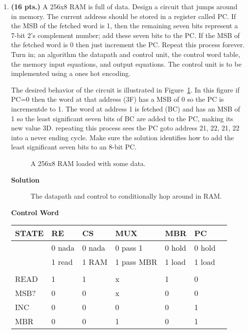 \begin{enumerate}
\item \textbf{ (16 pts.)}
A 256x8 RAM is full of data.  Design a circuit that jumps 
around in memory.   The current address should be stored in a
register called PC.  If the MSB of the fetched word is 1, then the 
remaining seven bits represent a 7-bit 2's complement number;  add these 
seven bits to the PC.  If the MSB of the fetched word is 0 then just 
increment the PC.  Repeat this process forever.
Turn in; an algorithm
the datapath and control unit,
the control word table,
the memory input equations, and
output equations.  
The control unit is to be implemented using a ones hot encoding.

The desired behavior of the circuit is illustrated in 
Figure~\ref{fig:RAMhopper2}.  In this figure if PC=0 then the word at
that address (3F) has a MSB of 0 so the PC is incrementde to 1. The
word at address 1 is fetched (BC) and has an MSB of 1 so the least
significant seven bits of BC are added to the PC, making its new value
3D.  repeating this process sees the PC goto address 21, 22, 21, 22
into a never ending cycle.   Make sure the solution identifies how
to add the least significant seven bits to an 8-bit PC.

\begin{figure}[ht]
\caption{A 256x8 RAM loaded with some data.}
\label{fig:RAMhopper2}
\end{figure}

\begin{onlysolution}  \textbf{Solution} \itshape{

\begin{figure}[ht]
\caption{The datapath and control to conditionally hop around
in RAM.}
\end{figure}


\textbf{ Control Word}

\begin{tabular}{l|l|l|l|l|l|l}
STATE & RE     & CS     &MUX          &MBR    & PC	\\ \hline
      & 0 nada & 0 nada &0 pass 1     &0 hold &0 hold	\\ \hline
      & 1 read & 1 RAM  &1 pass MBR   &1 load &1 load	\\ \hline
      &        &        &             &       &       	\\ \hline
READ  & 1      & 1      & x           & 1     & 0	\\ \hline
MSB?  & 0      & 0      & x           & 0     & 0	\\ \hline
INC   & 0      & 0      & 0           & 0     & 1	\\ \hline
MBR   & 0      & 0      & 1           & 0     & 1	\\ \hline
\end{tabular}

}
\end{onlysolution}
\end{enumerate}
